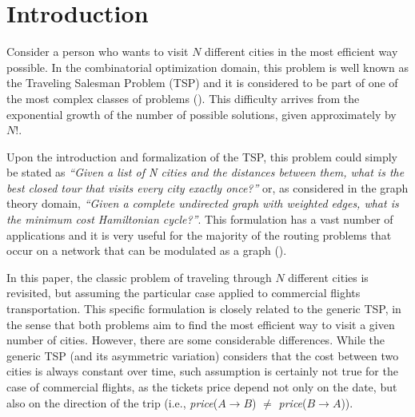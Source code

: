 \documentclass[onecolumn]{elsarticle}
\begin{document}



\section{Introduction}
\label{sec:intro}
Consider a person who wants to visit $N$ different cities in the most efficient way possible. In the combinatorial optimization domain, this problem is well known as the Traveling Salesman Problem (TSP) and it is considered to be part of one of the most complex classes of problems (\cite{np_completeness}). This difficulty arrives from the exponential growth of the number of possible solutions, given approximately by $N!$. 

Upon the introduction and formalization of the TSP, this problem could simply be stated as \textit{``Given a list of N cities and the distances between them, what is the best closed tour that visits every city exactly once?''} or, as considered in the graph theory domain, \textit{``Given a complete undirected graph with weighted edges, what is the minimum cost Hamiltonian cycle?''}. This formulation has a vast number of applications and it is very useful for the majority of the routing problems that occur on a network that can be modulated as a graph (\cite{tsp_book_computation,graph_theory_book}). 

In this paper, the classic problem of traveling through $N$ different cities is revisited, but assuming the particular case applied to commercial flights transportation. This specific formulation is closely related to the generic TSP, in the sense that both problems aim to find the most efficient way to visit a given number of cities. However, there are some considerable differences. While the generic TSP (and its asymmetric variation) considers that the cost between two cities is always constant over time, such assumption is certainly not true for the case of commercial flights, as the tickets price depend not only on the date, but also on the direction of the trip (i.e., \textit{price}(${A\rightarrow B}$) $\neq$ \textit{price}(${B\rightarrow A}$)).
\end{document}
